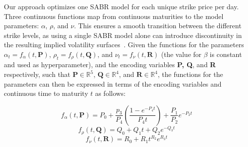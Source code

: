 Our approach optimizes one SABR model for each unique strike price per day.
Three continuous functions map from continuous maturities to the model parameters: $\alpha$, $\rho$, and $\nu$.
This ensures a smooth transition between the different strike levels,
as using a single SABR model alone can introduce discontinuity in the resulting implied volatility surfaces~\cite{Hagan2015, Kim2021}.
Given the functions for the parameters $\alpha_t = f_{\alpha}(t, \textbf{P})$, $\rho_t = f_{\rho}(t, \textbf{Q})$, and $\nu_t = f_{\nu}(t, \textbf{R})$
(the value for $\beta$ is constant and used as hyperparameter),
and the encoding variables \textbf{P, Q}, and \textbf{R} respectively, such that $\textbf{P} \in \mathbb{R}^{5}$, $\textbf{Q} \in \mathbb{R}^{4}$, and $\textbf{R} \in \mathbb{R}^{4}$,
the functions for the parameters can then be expressed in terms of the encoding variables and continuous time to maturity $t$ as follows:

\begin{equation*}
    \label{eq:f_alpha}
    f_{\alpha}(t, \textbf{P}) = P_0 + \frac{p_3}{P_4} \left( \frac{1 - e^{-P_4 t}}{P_4 t} \right) + \frac{P_1}{P_2} e^{-P_2 t}
\end{equation*}
\begin{equation*}
    \label{eq:f_rho}
    f_{\rho}(t, \textbf{Q}) = Q_0 + Q_1 t + Q_2 e^{-Q_3 t}
\end{equation*}
\begin{equation*}
    \label{eq:f_nu}
    f_{\nu}(t, \textbf{R}) = R_0 + R_1 t^{R_2} e^{R_3 t}
\end{equation*}


